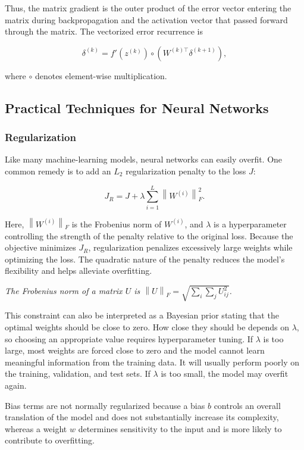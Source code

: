 \documentclass[
  a4paper,
  10pt]{article}
\renewenvironment{quote}
  {\begin{mdframed}[
      linewidth=0.7pt,
      linecolor=PaperRule,
      backgroundcolor=PaperShade,
      leftline=true,
      rightline=false,
      topline=false,
      bottomline=false,
      innerleftmargin=10pt,
      innerrightmargin=8pt,
      innertopmargin=7pt,
      innerbottommargin=7pt,
      skipabove=8pt,
      skipbelow=10pt
    ]\itshape}
  {\end{mdframed}}
\begin{document}
Thus, the matrix gradient is the outer product of the error vector
entering the matrix during backpropagation and the activation vector
that passed forward through the matrix. The vectorized error recurrence
is

\[
\delta^{(k)}
=f'\left(z^{(k)}\right)
\circ\left(W^{(k)\top}\delta^{(k+1)}\right),
\]

where \(\circ\) denotes element-wise multiplication.

\subsection{Practical Techniques for Neural
Networks}\label{practical-techniques-for-neural-networks}

\subsubsection{Regularization}\label{regularization}

Like many machine-learning models, neural networks can easily overfit.
One common remedy is to add an \(L_2\) regularization penalty to the
loss \(J\):

\[
J_R
=J+\lambda\sum_{i=1}^{L}
\left\lVert W^{(i)}\right\rVert_F^2.
\]

Here, \(\left\lVert W^{(i)}\right\rVert_F\) is the Frobenius norm of
\(W^{(i)}\), and \(\lambda\) is a hyperparameter controlling the
strength of the penalty relative to the original loss. Because the
objective minimizes \(J_R\), regularization penalizes excessively large
weights while optimizing the loss. The quadratic nature of the penalty
reduces the model's flexibility and helps alleviate overfitting.

\begin{quote}
The Frobenius norm of a matrix \(U\) is
\(\left\lVert U\right\rVert_F=\sqrt{\sum_i\sum_j U_{ij}^2}\).
\end{quote}

This constraint can also be interpreted as a Bayesian prior stating that
the optimal weights should be close to zero. How close they should be
depends on \(\lambda\), so choosing an appropriate value requires
hyperparameter tuning. If \(\lambda\) is too large, most weights are
forced close to zero and the model cannot learn meaningful information
from the training data. It will usually perform poorly on the training,
validation, and test sets. If \(\lambda\) is too small, the model may
overfit again.

Bias terms are not normally regularized because a bias \(b\) controls an
overall translation of the model and does not substantially increase its
complexity, whereas a weight \(w\) determines sensitivity to the input
and is more likely to contribute to overfitting.
\end{document}
